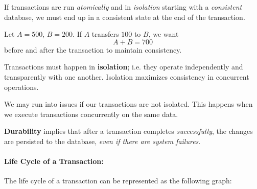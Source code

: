\documentclass{report}
\newenvironment{definition}[1]{\begin{tcolorbox}[title={Definition: #1}]}{\end{tcolorbox}}
\newenvironment{example}{\begin{tcolorbox}[title={Example},colback=green!5!white,colframe=black!75!green]}{\end{tcolorbox}}
\renewcommand{\bf}[1]{\textbf{{#1}}}
\renewcommand{\it}[1]{\textit{{#1}}}
\begin{document}
If transactions are run \it{atomically} and in \it{isolation} starting with a
\it{consistent} database, we must end up in a consistent state at the end of the
transaction.

\begin{example}
    Let $A = 500$, $B = 200$. If $A$ transfers $100$ to $B$, we want
    \[A + B = 700\]
    before and after the transaction to maintain consistency.
\end{example}

\begin{definition}{Isolation}
    Transactions must happen in \bf{isolation}; i.e. they operate independently
    and transparently with one another. Isolation maximizes consistency in
    concurrent operations.
\end{definition}

We may run into issues if our transactions are not isolated. This happens when
we execute transactions concurrently on the same data.

\begin{definition}{Durability}
    \bf{Durability} implies that after a transaction completes
    \it{successfully}, the changes are persisted to the database,
    \it{even if there are system failures}.
\end{definition}

\paragraph{Life Cycle of a Transaction:} The life cycle of a transaction can be
represented as the following graph:

{
    \centering
    \par
}
\end{document}
